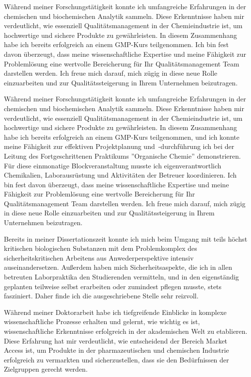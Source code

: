     {Während meiner Forschungstätigkeit konnte ich umfangreiche Erfahrungen in der chemischen und biochemischen Analytik sammeln. Diese Erkenntnisse haben mir verdeutlicht, wie essenziell Qualitätsmanagement in der Chemieindustrie ist, um hochwertige und sichere Produkte zu gewährleisten. In diesem Zusammenhang habe ich bereits erfolgreich an einem GMP-Kurs teilgenommen. Ich bin fest davon überzeugt, dass meine wissenschaftliche Expertise und meine Fähigkeit zur Problemlösung eine wertvolle Bereicherung für Ihr Qualitätsmanagement Team darstellen werden. Ich freue mich darauf, mich zügig in diese neue Rolle einzuarbeiten und zur Qualitätssteigerung in Ihrem Unternehmen beizutragen.\par }{}
    {Während meiner Forschungstätigkeit konnte ich umfangreiche Erfahrungen in der chemischen und biochemischen Analytik sammeln. Diese Erkenntnisse haben mir verdeutlicht, wie essenziell Qualitätsmanagement in der Chemieindustrie ist, um hochwertige und sichere Produkte zu gewährleisten. In diesem Zusammenhang habe ich bereits erfolgreich an einem GMP-Kurs teilgenommen, und ich konnte meine Fähigkeit zur effektiven Projektplanung \mbox{und -durchführung} ich bei der Leitung des Fortgeschrittenen Praktikums ''Organische Chemie'' demonstrieren. Für diese einmonatige Blockveranstaltung musste ich eigenverantwortlich Chemikalien, Laborausrüstung und Aktivitäten der Betreuer koordinieren. Ich bin fest davon überzeugt, dass meine wissenschaftliche Expertise und meine Fähigkeit zur Problemlösung eine wertvolle Bereicherung für Ihr Qualitätsmanagement Team darstellen werden. Ich freue mich darauf, mich zügig in diese neue Rolle einzuarbeiten und zur Qualitätssteigerung in Ihrem Unternehmen beizutragen.\par }{}
    {Bereits in meiner Dissertationszeit konnte ich mich beim Umgang mit teils höchst kritischen biologischen Substanzen mit dem Problemkomplex des sicherheitskritischen Arbeitens aus Anwederperspektive intensiv auseinandersetzen. Außerdem haben mich Sicherheitsaspekte, die ich in allen betreuten Laborpraktika den Studierenden vermitteln, und in den eigenständig geplanten teilweise selbst erarbeiten oder zumindest pflegen musste, stets fasziniert. Daher finde ich die ausgeschriebene Stelle sehr reizvoll. \par }{}

    {Während meiner Doktorarbeit habe ich tiefgreifende Einblicke in komplexe wissenschaftliche Prozesse erhalten und gelernt, wie wichtig es ist, wissenschaftliche Erkenntnisse erfolgreich in der akademischen Welt zu etablieren. Diese Erfahrung hat mir verdeutlicht, wie entscheidend der Bereich Market Access ist, um Produkte in der pharmazeutischen und chemischen Industrie erfolgreich zu vermarkten und sicherzustellen, dass sie den Bedürfnissen der Zielgruppen gerecht werden.\par}{}


